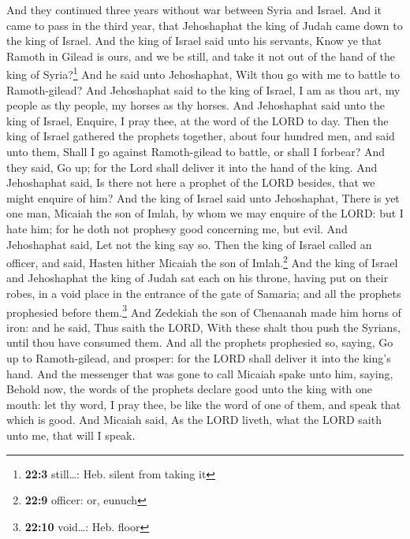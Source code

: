  And they continued three years without war between Syria
and Israel.  And it came to pass in the third year, that
Jehoshaphat the king of Judah came down to the king of Israel.
 And the king of Israel said unto his servants, Know ye
that Ramoth in Gilead is ours, and we be still, and take it not out of
the hand of the king of Syria?\footnote{\textbf{22:3} still\ldots: Heb.
  silent from taking it}  And he said unto Jehoshaphat,
Wilt thou go with me to battle to Ramoth-gilead? And Jehoshaphat said to
the king of Israel, I am as thou art, my people as thy people, my horses
as thy horses.  And Jehoshaphat said unto the king of
Israel, Enquire, I pray thee, at the word of the LORD to day.
 Then the king of Israel gathered the prophets together,
about four hundred men, and said unto them, Shall I go against
Ramoth-gilead to battle, or shall I forbear? And they said, Go up; for
the Lord shall deliver it into the hand of the king.  And
Jehoshaphat said, Is there not here a prophet of the LORD besides, that
we might enquire of him?  And the king of Israel said unto
Jehoshaphat, There is yet one man, Micaiah the son of Imlah, by whom we
may enquire of the LORD: but I hate him; for he doth not prophesy good
concerning me, but evil. And Jehoshaphat said, Let not the king say so.
 Then the king of Israel called an officer, and said,
Hasten hither Micaiah the son of Imlah.\footnote{\textbf{22:9} officer:
  or, eunuch}  And the king of Israel and Jehoshaphat the
king of Judah sat each on his throne, having put on their robes, in a
void place in the entrance of the gate of Samaria; and all the prophets
prophesied before them.\footnote{\textbf{22:10} void\ldots: Heb. floor}
 And Zedekiah the son of Chenaanah made him horns of
iron: and he said, Thus saith the LORD, With these shalt thou push the
Syrians, until thou have consumed them.  And all the
prophets prophesied so, saying, Go up to Ramoth-gilead, and prosper: for
the LORD shall deliver it into the king's hand.  And the
messenger that was gone to call Micaiah spake unto him, saying, Behold
now, the words of the prophets declare good unto the king with one
mouth: let thy word, I pray thee, be like the word of one of them, and
speak that which is good.  And Micaiah said, As the LORD
liveth, what the LORD saith unto me, that will I speak.

